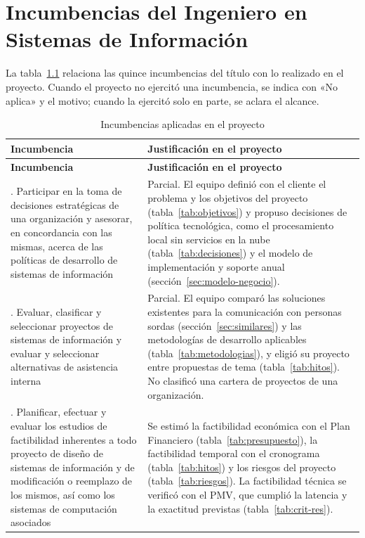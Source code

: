 \chapter{Incumbencias del Ingeniero en Sistemas de Información}

La tabla~\ref{tab:incumbencias} relaciona las quince incumbencias del título con lo realizado en el proyecto. Cuando el proyecto no ejercitó una incumbencia, se indica con «No aplica» y el motivo; cuando la ejercitó solo en parte, se aclara el alcance.

{\small
\begin{longtable}{>{\raggedright\arraybackslash}p{} >{\raggedright\arraybackslash}p{}}
    \caption{Incumbencias aplicadas en el proyecto}\label{tab:incumbencias} \\
    \toprule
    \textbf{Incumbencia} & \textbf{Justificación en el proyecto} \\
    \midrule
    \endfirsthead
    \toprule
    \textbf{Incumbencia} & \textbf{Justificación en el proyecto} \\
    \midrule
    \endhead
    1. Participar en la toma de decisiones estratégicas de una organización y asesorar, en concordancia con las mismas, acerca de las políticas de desarrollo de sistemas de información & Parcial. El equipo definió con el cliente el problema y los objetivos del proyecto (tabla~\ref{tab:objetivos}) y propuso decisiones de política tecnológica, como el procesamiento local sin servicios en la nube (tabla~\ref{tab:decisiones}) y el modelo de implementación y soporte anual (sección~\ref{sec:modelo-negocio}). \\ \midrule
    2. Evaluar, clasificar y seleccionar proyectos de sistemas de información y evaluar y seleccionar alternativas de asistencia interna & Parcial. El equipo comparó las soluciones existentes para la comunicación con personas sordas (sección~\ref{sec:similares}) y las metodologías de desarrollo aplicables (tabla~\ref{tab:metodologias}), y eligió su proyecto entre propuestas de tema (tabla~\ref{tab:hitos}). No clasificó una cartera de proyectos de una organización. \\ \midrule
    3. Planificar, efectuar y evaluar los estudios de factibilidad inherentes a todo proyecto de diseño de sistemas de información y de modificación o reemplazo de los mismos, así como los sistemas de computación asociados & Se estimó la factibilidad económica con el Plan Financiero (tabla~\ref{tab:presupuesto}), la factibilidad temporal con el cronograma (tabla~\ref{tab:hitos}) y los riesgos del proyecto (tabla~\ref{tab:riesgos}). La factibilidad técnica se verificó con el PMV, que cumplió la latencia y la exactitud previstas (tabla~\ref{tab:crit-res}). \\ \midrule

\end{longtable}}
